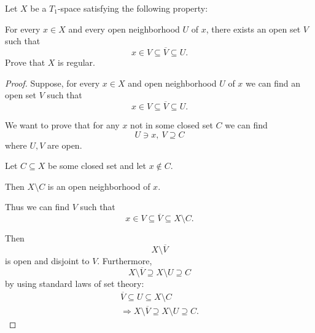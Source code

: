 \documentclass[11pt]{article}
\begin{document}
\begin{prob}
    Let $X$ be a $T_1$-space satisfying the 
    following property: 

    For every $x \in X$ and every open neighborhood 
    $U$ of $x$, there exists an open set 
    $V$ such that 
    \[
        x \in V \subseteq \overline V \subseteq U. 
    \]
    Prove that $X$ is regular. 
\end{prob}
\begin{proof}
    Suppose, for every $x \in X$ and open neighborhood 
    $U$ of $x$ we can find an open set $V$ such that 
    \[
        x \in V \subseteq \overline V \subseteq U. 
    \]

    We want to prove that for any $x$ not in 
    some closed set $C$ we can find 
    \[
        U \ni x, \ V \supseteq C 
    \]
    where $U,V$ are open. 

    Let $C\subseteq X$ be some closed set and 
    let $x \not\in C$. 

    Then $X \setminus C$ is an open neighborhood of 
    $x$. 

    Thus we can find $V$ such that 
    \[
        x \in V \subseteq \overline V \subseteq X \setminus C. 
    \]

    Then 
    \[
        X \setminus \overline V 
    \]
    is open and disjoint to $V$. 
    Furthermore, 
    \[
        X \setminus \overline V \supseteq X \setminus 
        U \supseteq C 
    \]
    by using standard laws of set theory: 
    \begin{align*}
        \overline V \subseteq  U 
        \subseteq X \setminus C \\ 
        \Rightarrow X \setminus \overline V 
        \supseteq X \setminus U \supseteq C. 
    \end{align*}
\end{proof}
\end{document}
